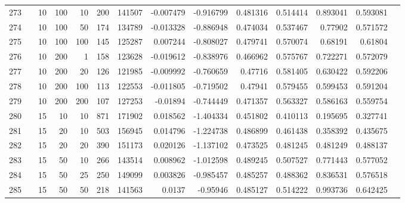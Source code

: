 \begin{longtable}{llrrrrrrrrrrrr}
		273 & &           10 &               100 &           10 &         200 &     141507 & -0.007479 & -0.916799 &  0.481316 &    0.514414 &       0.893041 &  0.593081 \\
		274 & &           10 &               100 &           50 &         174 &     134789 & -0.013328 & -0.886948 &  0.474034 &    0.537467 &        0.77902 &  0.571572 \\
		275 & &           10 &               100 &          100 &         145 &     125287 &  0.007244 & -0.808027 &  0.479741 &    0.570074 &        0.68191 &   0.61804 \\
		276 & &           10 &               200 &            1 &         158 &     123628 & -0.019612 & -0.838976 &  0.466962 &    0.575767 &       0.722271 &  0.572079 \\
		277 & &           10 &               200 &           20 &         126 &     121985 & -0.009992 & -0.760659 &   0.47716 &    0.581405 &       0.630422 &  0.592206 \\
		278 & &           10 &               200 &          100 &         113 &     122553 & -0.011805 & -0.719502 &   0.47941 &    0.579455 &       0.599453 &  0.591204 \\
		279 & &           10 &               200 &          200 &         107 &     127253 &  -0.01894 & -0.744449 &  0.471357 &    0.563327 &       0.586163 &  0.559754 \\
		280 & &           15 &                10 &           10 &         871 &     171902 &  0.018562 & -1.404334 &  0.451802 &    0.410113 &       0.195695 &  0.327741 \\
		281 & &           15 &                20 &           10 &         503 &     156945 &  0.014796 & -1.224738 &  0.486899 &    0.461438 &       0.358392 &  0.435675 \\
		282 & &           15 &                20 &           20 &         390 &     151173 &  0.020126 & -1.137102 &  0.473525 &    0.481245 &       0.481249 &  0.488137 \\
		283 & &           15 &                50 &           10 &         266 &     143514 &  0.008962 & -1.012598 &  0.489245 &    0.507527 &       0.771443 &  0.577052 \\
		284 & &           15 &                50 &           25 &         250 &     149099 &  0.003826 & -0.985457 &  0.485257 &    0.488362 &       0.836531 &  0.576518 \\
		285 & &           15 &                50 &           50 &         218 &     141563 &    0.0137 &  -0.95946 &  0.485127 &    0.514222 &       0.993736 &  0.642425 \\

\end{longtable}
